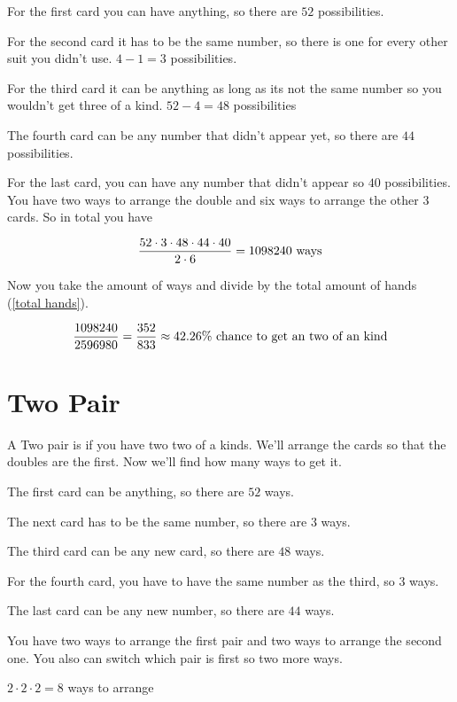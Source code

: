 \documentclass[12pt]{article}
\begin{document}
For the first card you can have anything, so there are $52$ possibilities.

For the second card it has to be the same number, so there is one for every other suit you didn't use. $4 - 1 = 3$ possibilities.

For the third card it can be anything as long as its not the same number so you wouldn't get three of a kind. $52 - 4 = 48$ possibilities

The fourth card can be any number that didn't appear yet, so there are $44$ possibilities.

For the last card, you can have any number that didn't appear so $40$ possibilities.
You have two ways to arrange the double and six ways to arrange the other 3 cards.
So in total you have

\begin{equation}
{52 \cdot 3 \cdot 48 \cdot 44 \cdot 40 \over 2 \cdot 6} = 1098240  \hbox{ ways}
\end{equation}


Now you take the amount of ways and divide by the total amount of hands (\ref{total hands}).

\begin{equation}
{1098240 \over 2596980} = {352 \over 833} \approx  42.26\% \hbox{ chance to get an two of an kind}
\end{equation}

\section{Two Pair}

A Two pair is if you have two two of a kinds.
We'll arrange the cards so that the doubles are the first.
Now we'll find how many ways to get it.

The first card can be anything, so there are $52$ ways.

The next card has to be the same number, so there are $3$ ways.

The third card can be any new card, so there are $48$ ways.

For the fourth card, you have to have the same number as the third, so $3$ ways.

The last card can be any new number, so there are $44$ ways.

You have two ways to arrange the first pair and two ways to arrange the second one. You also can switch which pair is first so two more ways.

$ 2 \cdot 2 \cdot 2 = 8$ ways to arrange
\end{document}
